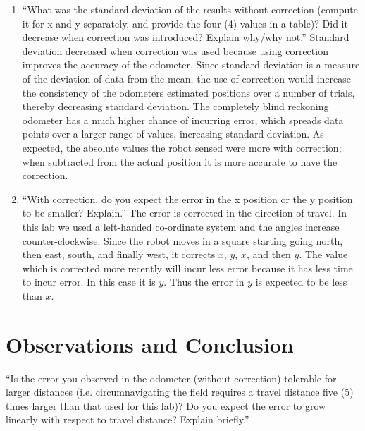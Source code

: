 \documentclass[twocolumn]{article}
\begin{document}
\begin{enumerate}

\item ``What was the standard deviation of the results without correction (compute it for x and y separately, and provide the four (4) values in a table)? Did it decrease when correction was introduced? Explain why/why not.\cite{lab2}'' Standard deviation decreased when correction was used because using correction improves the accuracy of the odometer. Since standard deviation is a measure of the deviation of data from the mean, the use of correction would increase the consistency of the odometers estimated positions over a number of trials, thereby decreasing standard deviation. The completely blind reckoning odometer has a much higher chance of incurring error, which spreads data points over a larger range of values, increasing standard deviation. As expected, the absolute values the robot sensed were more with correction; when subtracted from the actual position it is more accurate to have the correction.

\item ``With correction, do you expect the error in the x position or the y position to be smaller? Explain.'' The error is corrected in the direction of travel. In this lab we used a left-handed co-ordinate system and the angles increase counter-clockwise.
Since the robot moves in a square starting going north, then east, south, and finally west, it corrects $x$, $y$, $x$, and then $y$. The value which is corrected more recently will incur less error because it has less time to incur error. In this case it is $y$. Thus the error in $y$ is expected to be less than $x$.

\end{enumerate}

\section{Observations and Conclusion}

``Is the error you observed in the odometer (without correction) tolerable for larger distances (i.e. circumnavigating the field requires a travel distance five (5) times larger than that used for this lab)? Do you expect the error to grow linearly with respect to travel distance? Explain briefly.\cite{lab2}''
\end{document}
